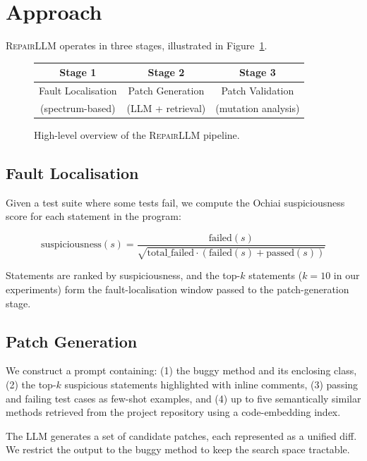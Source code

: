 \section{Approach}

\textsc{RepairLLM} operates in three stages, illustrated in
Figure~\ref{fig:overview}.

\begin{figure}[!t]
\centering
{\footnotesize\color{muted}
\begin{tabular}{|c|c|c|}
\hline
\textbf{Stage 1} & \textbf{Stage 2} & \textbf{Stage 3} \\
\hline
Fault Localisation & Patch Generation & Patch Validation \\
(spectrum-based)   & (LLM + retrieval)   & (mutation analysis) \\
\hline
\end{tabular}
}
\caption{High-level overview of the \textsc{RepairLLM} pipeline.}
\label{fig:overview}
\end{figure}

\subsection{Fault Localisation}

Given a test suite where some tests fail, we compute the Ochiai
suspiciousness score for each statement in the program:

\begin{equation}
  \text{suspiciousness}(s) = \frac{\text{failed}(s)}
    {\sqrt{\text{total\_failed} \cdot (\text{failed}(s) + \text{passed}(s))}}
  \label{eq:ochiai}
\end{equation}

Statements are ranked by suspiciousness, and the top-$k$ statements
($k{=}10$ in our experiments) form the fault-localisation window passed
to the patch-generation stage.

\subsection{Patch Generation}

We construct a prompt containing: (1) the buggy method and its enclosing
class, (2) the top-$k$ suspicious statements highlighted with inline
comments, (3) passing and failing test cases as few-shot examples, and
(4) up to five semantically similar methods retrieved from the project
repository using a code-embedding index.

The LLM generates a set of candidate patches, each represented as a
unified diff. We restrict the output to the buggy method to keep the
search space tractable.

